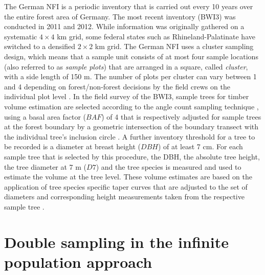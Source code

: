 The German NFI is a periodic inventory that is carried out every 10 years over the entire forest area of Germany. The most recent inventory (BWI3) was conducted in 2011 and 2012. While information was originally gathered on a systematic $4 \times 4$ km grid, some federal states such as Rhineland-Palatinate have switched to a densified $2 \times 2$ km grid. The German NFI uses a cluster sampling design, which means that a sample unit consists of at most four sample locations (also referred to as \textit{sample plots}) that are arranged in a square, called \textit{cluster}, with a side length of 150 m. The number of plots per cluster can vary between 1 and 4 depending on forest/non-forest decisions by the field crews on the individual plot level \citep{bwi3_aufn}. In the field survey of the BWI3, sample trees for timber volume estimation are selected according to the angle count sampling technique \citep{bitterlich1984}, using a basal area factor ($BAF$) of 4 that is respectively adjusted for sample trees at the forest boundary by a geometric intersection of the boundary transect with the individual tree's inclusion circle \citep{bwi3_aufn}. A further inventory threshold for a tree to be recorded is a diameter at breast height ($DBH$) of at least 7 cm. For each sample tree that is selected by this procedure, the DBH, the absolute tree height, the tree diameter at 7 m ($D7$) and the tree species is measured and used to estimate the volume at the tree level. These volume estimates are based on the application of tree species specific taper curves that are adjusted to the set of diameters and corresponding height measurements taken from the respective sample tree \citep{kublin2013}.


\section{Double sampling in the infinite population approach}
\label{sec:inf_pop}


